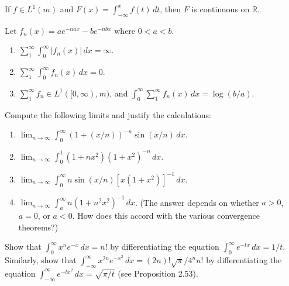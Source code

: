 	\begin{exercise}[Folland 2.26]
		If $f \in L^1(m)$ and $F(x) = \int_{-\infty}^x f(t) \, dt$, then $F$ is continuous on $\mathbb{R}$.
	\end{exercise}
	\begin{solution}

	\end{solution}

	\begin{exercise}[Folland 2.27]
		Let $f_n(x) = ae^{-nax} - be^{-nbx}$ where $0 < a < b$.
		\begin{enumerate}[label=\textbf{\alph*.}]
			\item $\sum_1^\infty \int_0^\infty |f_n(x)| \, dx = \infty$.
			\item $\sum_1^\infty \int_0^\infty f_n(x) \, dx = 0$.
			\item $\sum_1^\infty f_n \in L^1([0, \infty), m)$, and $\int_0^\infty \sum_1^\infty f_n(x) \, dx = \log(b/a)$.
		\end{enumerate}
	\end{exercise}
	\begin{solution}

	\end{solution}

	\begin{exercise}[Folland 2.28]
		Compute the following limits and justify the calculations:
		\begin{enumerate}[label=\textbf{\alph*.}]
			\item $\lim_{n \to \infty} \int_0^\infty (1 + (x/n))^{-n} \sin(x/n) \, dx$.
			\item $\lim_{n \to \infty} \int_0^1 (1 + nx^2)(1 + x^2)^{-n} \, dx$.
			\item $\lim_{n \to \infty} \int_0^\infty n \sin(x/n) [x(1 + x^2)]^{-1} \, dx$.
			\item $\lim_{n \to \infty} \int_a^\infty n(1 + n^2x^2)^{-1} \, dx$. (The answer depends on whether $a > 0$, $a = 0$, or $a < 0$. How does this accord with the various convergence theorems?)
		\end{enumerate}
	\end{exercise}
	\begin{solution}

	\end{solution}

	\begin{exercise}[Folland 2.29]
		Show that $\int_0^\infty x^n e^{-x} \, dx = n!$ by differentiating the equation $\int_0^\infty e^{-tx} \, dx = 1/t$. Similarly, show that $\int_{-\infty}^\infty x^{2n} e^{-x^2} \, dx = (2n)!\sqrt{\pi}/4^n n!$ by differentiating the equation $\int_{-\infty}^\infty e^{-tx^2} \, dx = \sqrt{\pi/t}$ (see Proposition 2.53).
	\end{exercise}
	\begin{solution}

	\end{solution}

